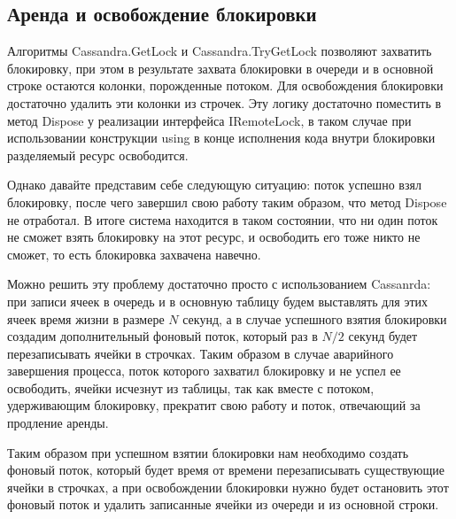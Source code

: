\subsection{Аренда и освобождение блокировки}

Алгоритмы Cassandra.GetLock и Cassandra.TryGetLock позволяют захватить блокировку, при этом в результате захвата блокировки в очереди и в основной строке остаются колонки, порожденные потоком. Для освобождения блокировки достаточно удалить эти колонки из строчек. Эту логику достаточно поместить в метод Dispose у реализации интерфейса IRemoteLock, в таком случае при использовании конструкции using в конце исполнения кода внутри блокировки разделяемый ресурс освободится.

Однако давайте представим себе следующую ситуацию: поток успешно взял блокировку, после чего завершил свою работу таким образом, что метод Dispose не отработал. В итоге система находится в таком состоянии, что ни один поток не сможет взять блокировку на этот ресурс, и освободить его тоже никто не сможет, то есть блокировка захвачена навечно.

Можно решить эту проблему достаточно просто с использованием Cassanrda: при записи ячеек в очередь и в основную таблицу будем выставлять для этих ячеек время жизни в размере $N$ секунд, а в случае успешного взятия блокировки создадим дополнительный фоновый поток, который раз в $N/2$ секунд будет перезаписывать ячейки в строчках. Таким образом в случае аварийного завершения процесса, поток которого захватил блокировку и не успел ее освободить, ячейки исчезнут из таблицы, так как вместе с потоком, удерживающим блокировку, прекратит свою работу и поток, отвечающий за продление аренды.

Таким образом при успешном взятии блокировки нам необходимо создать фоновый поток, который будет время от времени перезаписывать существующие ячейки в строчках, а при освобождении блокировки нужно будет остановить этот фоновый поток и удалить записанные ячейки из очереди и из основной строки.
